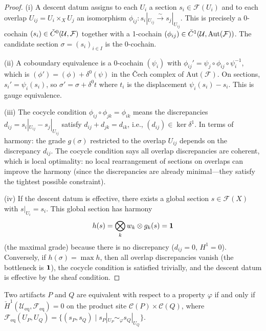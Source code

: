\begin{proof}
(i)\; A descent datum assigns to each $U_i$ a section
$s_i \in \mathcal{F}(U_i)$ and to each overlap $U_{ij} = U_i
\times_X U_j$ an isomorphism $\phi_{ij} : s_i|_{U_{ij}}
\xrightarrow{\sim} s_j|_{U_{ij}}$.  This is precisely a 0-cochain
$(s_i) \in \check{C}^0(\mathcal{U}, \mathcal{F})$ together with a
1-cochain $(\phi_{ij}) \in \check{C}^1(\mathcal{U},
\mathrm{Aut}(\mathcal{F}))$.  The candidate section
$\sigma = (s_i)_{i \in I}$ is the 0-cochain.

(ii)\; A coboundary equivalence is a 0-cochain $(\psi_i)$ with
$\phi_{ij}' = \psi_j \circ \phi_{ij} \circ \psi_i^{-1}$, which is
$(\phi') = (\phi) + \delta^0(\psi)$ in the \v{C}ech complex of
$\mathrm{Aut}(\mathcal{F})$.  On sections, $s_i' = \psi_i(s_i)$,
so $\sigma' = \sigma + \delta^0 t$ where $t_i$ is the displacement
$\psi_i(s_i) - s_i$.  This is gauge equivalence.

(iii)\; The cocycle condition $\phi_{ij} \circ \phi_{jk} = \phi_{ik}$
means the discrepancies $d_{ij} = s_i|_{U_{ij}} - s_j|_{U_{ij}}$
satisfy $d_{ij} + d_{jk} = d_{ik}$, i.e., $(d_{ij}) \in
\ker \delta^1$.  In terms of harmony: the grade $g(\sigma)$
restricted to the overlap $U_{ij}$ depends on the discrepancy
$d_{ij}$.  The cocycle condition says all overlap discrepancies are
coherent, which is local optimality: no local rearrangement of
sections on overlaps can improve the harmony (since the discrepancies
are already minimal---they satisfy the tightest possible constraint).

(iv)\; If the descent datum is effective, there exists a global
section $s \in \mathcal{F}(X)$ with $s|_{U_i} = s_i$.  This global
section has harmony
\[
  h(s) = \bigotimes_k w_k \otimes g_k(s) = \mathbf{1}
\]
(the maximal grade) because there is no discrepancy ($d_{ij} = 0$,
$H^1 = 0$).  Conversely, if $h(\sigma) = \max h$, then all overlap
discrepancies vanish (the bottleneck is $\mathbf{1}$), the cocycle
condition is satisfied trivially, and the descent datum is effective
by the sheaf condition.
\end{proof}

\begin{corollary}
\label{cor:equiv-descent}
Two artifacts $P$ and $Q$ are equivalent with respect to a property
$\varphi$ if and only if
$\check{H}^1(\mathcal{U}_{\mathrm{eq}},
\mathcal{F}_{\mathrm{eq}}) = 0$
on the product site $\mathcal{C}(P) \times \mathcal{C}(Q)$, where
$\mathcal{F}_{\mathrm{eq}}(U_P, U_Q) =
\{(s_P, s_Q) \mid s_P|_{U_P} \sim_\varphi s_Q|_{U_Q}\}$.
\end{corollary}

